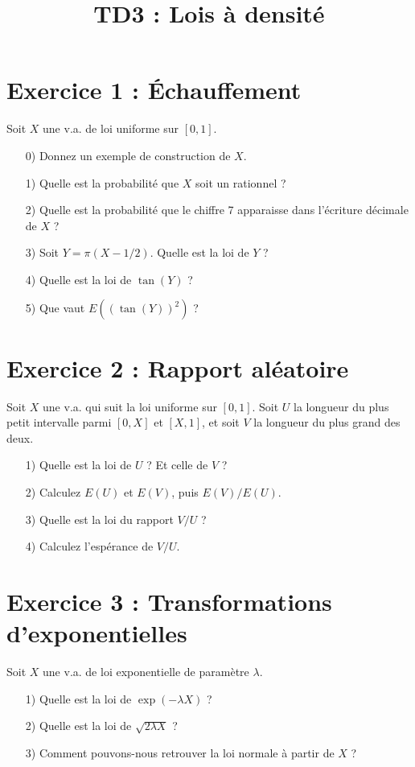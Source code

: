 \documentclass[12pt,a4paper]{article}
\title{TD3 : Lois à densité}
\date{}
\begin{document}
\maketitle

\section*{Exercice 1 : Échauffement}
Soit $X$ une v.a. de loi uniforme sur $[0,1]$.
\begin{enumerate}
    \item[0)] Donnez un exemple de construction de $X$.
    \item[1)] Quelle est la probabilité que $X$ soit un rationnel ?
    \item[2)] Quelle est la probabilité que le chiffre 7 apparaisse dans l’écriture décimale de $X$ ?
    \item[3)] Soit $Y = \pi (X - 1/2)$. Quelle est la loi de $Y$ ?
    \item[4)] Quelle est la loi de $\tan(Y)$ ?
    \item[5)] Que vaut $E((\tan(Y))^2)$ ?
\end{enumerate}

\section*{Exercice 2 : Rapport aléatoire}
Soit $X$ une v.a. qui suit la loi uniforme sur $[0,1]$.  
Soit $U$ la longueur du plus petit intervalle parmi $[0,X]$ et $[X,1]$, et soit $V$ la longueur du plus grand des deux.
\begin{enumerate}
    \item[1)] Quelle est la loi de $U$ ? Et celle de $V$ ?
    \item[2)] Calculez $E(U)$ et $E(V)$, puis $E(V)/E(U)$.
    \item[3)] Quelle est la loi du rapport $V/U$ ?
    \item[4)] Calculez l’espérance de $V/U$.
\end{enumerate}

\section*{Exercice 3 : Transformations d’exponentielles}
Soit $X$ une v.a. de loi exponentielle de paramètre $\lambda$.
\begin{enumerate}
    \item[1)] Quelle est la loi de $\exp(-\lambda X)$ ?
    \item[2)] Quelle est la loi de $\sqrt{2\lambda X}$ ?
    \item[3)] Comment pouvons-nous retrouver la loi normale à partir de $X$ ?
\end{enumerate}
\end{document}
